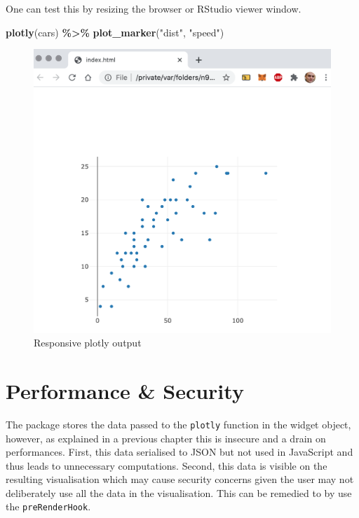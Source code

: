 \documentclass[
]{krantz}
\makeatletter
\newenvironment{Shaded}{\begin{snugshade}}{\end{snugshade}}
\newcommand{\KeywordTok}[1]{\textcolor[rgb]{0.27,0.27,0.27}{\textbf{#1}}}
\newcommand{\NormalTok}[1]{#1}
\newcommand{\OperatorTok}[1]{\textcolor[rgb]{0.43,0.43,0.43}{\textbf{#1}}}
\newcommand{\StringTok}[1]{\textcolor[rgb]{0.5,0.5,0.5}{#1}}
\newenvironment{kframe}{%
\medskip{}
\setlength{\fboxsep}{.8em}
 \def\at@end@of@kframe{}%
 \ifinner\ifhmode%
  \def\at@end@of@kframe{\end{minipage}}%
  \begin{minipage}{\columnwidth}%
 \fi\fi%
 \def\FrameCommand##1{\hskip\@totalleftmargin \hskip-\fboxsep
 \colorbox{shadecolor}{##1}\hskip-\fboxsep
     \hskip-\linewidth \hskip-\@totalleftmargin \hskip\columnwidth}%
 \MakeFramed {\advance\hsize-\width
   \@totalleftmargin\z@ \linewidth\hsize
   \@setminipage}}%
 {\par\unskip\endMakeFramed%
 \at@end@of@kframe}
\renewenvironment{Shaded}{\begin{kframe}}{\end{kframe}}
\makeatother
\begin{document}
One can test this by resizing the browser or RStudio viewer window.

\begin{Shaded}
\begin{Highlighting}[]
\KeywordTok{plotly}\NormalTok{(cars) }\OperatorTok{\%>\%}\StringTok{  }
\StringTok{      }\KeywordTok{plot\_marker}\NormalTok{(}\StringTok{"dist"}\NormalTok{, }\StringTok{"speed"}\NormalTok{)}
\end{Highlighting}
\end{Shaded}

\begin{figure}
\centering
\includegraphics{images/plotlier-responsive.png}
\caption{Responsive plotly output}
\end{figure}

\hypertarget{widgets-ex-plotly-perf-security}{%
\section{Performance \& Security}\label{widgets-ex-plotly-perf-security}}

The package stores the data passed to the \texttt{plotly} function in the widget object, however, as explained in a previous chapter this is insecure and a drain on performances. First, this data serialised to JSON but not used in JavaScript and thus leads to unnecessary computations. Second, this data is visible on the resulting visualisation which may cause security concerns given the user may not deliberately use all the data in the visualisation. This can be remedied to by use the \texttt{preRenderHook}.
\end{document}
